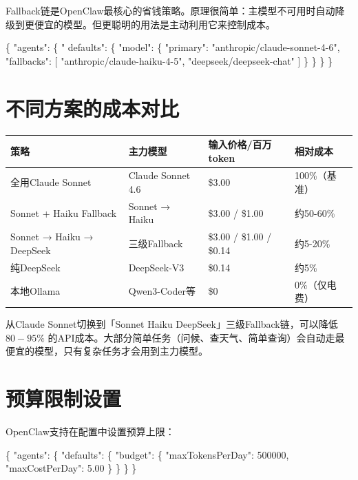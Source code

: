 \documentclass[
  10
]{article}
\newenvironment{Shaded}{}{}
\newcommand{\DataTypeTok}[1]{\textcolor[rgb]{0.56,0.13,0.00}{#1}}
\newcommand{\DecValTok}[1]{\textcolor[rgb]{0.25,0.63,0.44}{#1}}
\newcommand{\FloatTok}[1]{\textcolor[rgb]{0.25,0.63,0.44}{#1}}
\newcommand{\FunctionTok}[1]{\textcolor[rgb]{0.02,0.16,0.49}{#1}}
\newcommand{\NormalTok}[1]{#1}
\newcounter{none} %
\begin{document}
Fallback链是OpenClaw最核心的省钱策略。原理很简单：主模型不可用时自动降级到更便宜的模型。但更聪明的用法是主动利用它来控制成本。

\begin{Shaded}
\begin{Highlighting}[]
\NormalTok{\{ "agents": \{ " defaults": \{ "model": \{ "primary": "anthropic/claude{-}sonnet{-}4{-}6", "fallbacks": [ "anthropic/claude{-}haiku{-}4{-}5", "deepseek/deepseek{-}chat" ] \} \} \} \}}
\end{Highlighting}
\end{Shaded}

\section{不同方案的成本对比}\label{ux4e0dux540cux65b9ux6848ux7684ux6210ux672cux5bf9ux6bd4}

{\def\LTcaptype{none} %
\begin{longtable}[]{@{}|l|l|l|l|@{}}
\toprule\noalign{}
\endhead
\bottomrule\noalign{}
\endlastfoot
\hline
策略 & 主力模型 & 输入价格/百万token & 相对成本 \\
\hline
全用Claude Sonnet & Claude Sonnet 4.6 & \$3.00 & 100\%（基准） \\
\hline
Sonnet + Haiku Fallback & Sonnet → Haiku & \$3.00 / \$1.00 &
约50-60\% \\
\hline
Sonnet → Haiku → DeepSeek & 三级Fallback & \$3.00 / \$1.00 / \$0.14 &
约5-20\% \\
\hline
纯DeepSeek & DeepSeek-V3 & \$0.14 & 约5\% \\
\hline
本地Ollama & Qwen3-Coder等 & \$0 & 0\%（仅电费） \\
\hline
\end{longtable}
}

从Claude Sonnet切换到「Sonnet Haiku DeepSeek」三级Fallback链，可以降低
\(8 0 { - } 9 5 \%\)
的API成本。大部分简单任务（问候、查天气、简单查询）会自动走最便宜的模型，只有复杂任务才会用到主力模型。

\section{预算限制设置}\label{ux9884ux7b97ux9650ux5236ux8bbeux7f6e}

OpenClaw支持在配置中设置预算上限：

\begin{Shaded}
\begin{Highlighting}[]
\FunctionTok{\{}
    \DataTypeTok{"agents"}\FunctionTok{:} \FunctionTok{\{}
        \DataTypeTok{"defaults"}\FunctionTok{:} \FunctionTok{\{}
            \DataTypeTok{"budget"}\FunctionTok{:} \FunctionTok{\{}
                \DataTypeTok{"maxTokensPerDay"}\FunctionTok{:} \DecValTok{500000}\FunctionTok{,}
                \DataTypeTok{"maxCostPerDay"}\FunctionTok{:} \FloatTok{5.00}
            \FunctionTok{\}}
        \FunctionTok{\}}
    \FunctionTok{\}}
\FunctionTok{\}}
\end{Highlighting}
\end{Shaded}
\end{document}
